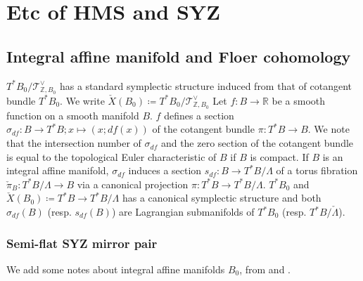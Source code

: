 \documentclass[a4paper,dvipdfmx,reqno,12pt]{amsart}
\theoremstyle{definition}
\newcommand{\deq}{\coloneqq}
\numberwithin{equation}{section}
\begin{document}
\section{Etc of HMS and SYZ}
\label{appendix-integral-affine-manifold}

\subsection{Integral affine manifold and Floer cohomology}

$T^{*}B_0/\mathcal{T}^{\vee}_{\mathbb{Z},B_0}$ has 
a standard symplectic structure induced from that of 
cotangent bundle $T^{*}B_0$.
We write $\check{X}(B_0)\deq 
T^{*}B_0/\mathcal{T}^{\vee}_{\mathbb{Z},B_0}$
Let $f\colon B\to \mathbb{R}$ be a 
smooth function on a smooth manifold $B$.
$f$ defines a section 
$\sigma_{df}\colon B\to T^{*}B; x\mapsto (x;df(x))$ of 
the cotangent bundle $\pi\colon T^{*}B\to B$.
We note that the intersection number of 
$\sigma_{df}$ and the zero section of the cotangent
bundle is equal to the topological Euler characteristic
of $B$ if $B$ is compact.
If $B$ is an integral affine manifold,
$\sigma_{df}$ induces a section 
$s_{df}\colon B\to T^*B/\Lambda$ of a torus fibration
$\check{\pi}_B\colon T^*B/\Lambda \to B$ via a canonical 
projection $\pi \colon T^*B\to T^*B/\Lambda$.
$T^{*}B_0$ and $\check{X}(B_0)\deq T^*B\to T^*B/\Lambda$
has a canonical symplectic structure and
both $\sigma_{df}(B)$ (resp. $s_{df}(B)$) are Lagrangian 
submanifolds of $T^{*}B_0$ 
(resp. $T^*B/\check{\Lambda}$).




\subsubsection{Semi-flat SYZ mirror pair}

We add some notes about integral affine manifolds $B_0$,
from \cite[Chapter 6]{MR2567952} and \cite{sepethesis}.
\end{document}
